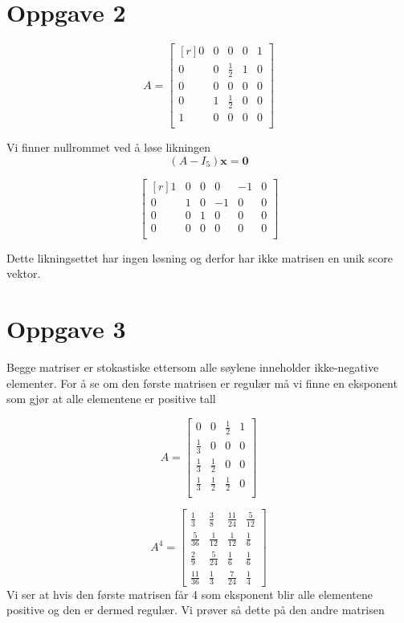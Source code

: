 \documentclass{article}
\begin{document}
\section*{Oppgave 2}

\[
A = 
\begin{bmatrix*}[r]
 0 & 0 & 0 & 0 & 1 \\
 0 & 0 & \frac{1}{2} & 1 & 0 \\
 0 & 0 & 0 & 0 & 0 \\
 0 & 1 & \frac{1}{2} & 0 & 0 \\
 1 & 0 & 0 & 0 & 0 \\
\end{bmatrix*}
\]

Vi finner nullrommet ved å løse likningen 
\[
(A - I_5) \mathbf{x} = \mathbf 0 
\]

\[
\begin{bmatrix*}[r]
 1 & 0 & 0 & 0 & -1 & 0 \\
 0 & 1 & 0 & -1 & 0 & 0 \\
 0 & 0 & 1 & 0 & 0 & 0 \\
 0 & 0 & 0 & 0 & 0 & 0 \\

\end{bmatrix*}
\]

Dette likningsettet har ingen løsning og derfor har ikke matrisen en unik score vektor. 

\section*{Oppgave 3}
Begge matriser er stokastiske ettersom alle søylene inneholder ikke-negative elementer. For å se om den første matrisen er regulær må vi finne en eksponent som gjør at alle elementene er positive tall

\[
  A = \begin{bmatrix}
   0 & 0 & \frac{1}{2} & 1 \\[1.1em]
   \frac{1}{3} & 0 & 0 & 0 \\[1.1em]
   \frac{1}{3} & \frac{1}{2} & 0 & 0 \\[1.1em]
   \frac{1}{3} & \frac{1}{2} & \frac{1}{2} & 0 \\ 
  \end{bmatrix}
  \]

\[
A^{4} = \begin{bmatrix}
\frac{1}{3} & \frac{3}{8} & \frac{11}{24} & \frac{5}{12}\\[1.1em]
\frac{5}{36} & \frac{1}{12} & \frac{1}{12} & \frac{1}{6}\\[1.1em]
\frac{2}{9} & \frac{5}{24} & \frac{1}{6} & \frac{1}{6}\\[1.1em]
\frac{11}{36} & \frac{1}{3} & \frac{7}{24} & \frac{1}{4}
\end{bmatrix}
\]
Vi ser at hvis den første matrisen får 4 som eksponent blir alle elementene positive og den er dermed regulær.
Vi prøver så dette på den andre matrisen
\end{document}

